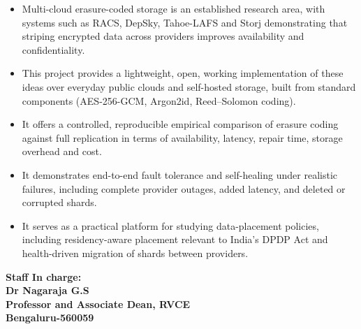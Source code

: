 \documentclass[11pt,a4paper]{article}
\begin{document}
\begin{itemize}[leftmargin=*,label=\textbullet,itemsep=4pt]
  \item Multi-cloud erasure-coded storage is an established research area, with systems such as RACS,
        DepSky, Tahoe-LAFS and Storj demonstrating that striping encrypted data across providers improves
        availability and confidentiality.
  \item This project provides a lightweight, open, working implementation of these ideas over everyday
        public clouds and self-hosted storage, built from standard components (AES-256-GCM, Argon2id,
        Reed--Solomon coding).
  \item It offers a controlled, reproducible empirical comparison of erasure coding against full
        replication in terms of availability, latency, repair time, storage overhead and cost.
  \item It demonstrates end-to-end fault tolerance and self-healing under realistic failures, including
        complete provider outages, added latency, and deleted or corrupted shards.
  \item It serves as a practical platform for studying data-placement policies, including residency-aware
        placement relevant to India's DPDP Act and health-driven migration of shards between providers.
\end{itemize}

\vspace{1cm}
\begin{center}
\textbf{Staff In charge:}\\
\textbf{Dr Nagaraja G.S}\\
\textbf{Professor and Associate Dean, RVCE}\\
\textbf{Bengaluru-560059}
\end{center}
\end{document}
